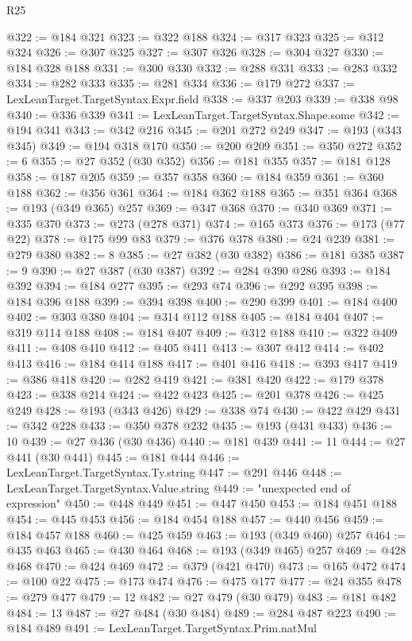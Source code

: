 \begin{lexlean}{R25}
\begin{coremodule}
@322 := @184 @321
@323 := @322 @188
@324 := @317 @323
@325 := @312 @324
@326 := @307 @325
@327 := @307 @326
@328 := @304 @327
@330 := @184 @328 @188
@331 := @300 @330
@332 := @288 @331
@333 := @283 @332
@334 := @282 @333
@335 := @281 @334
@336 := @179 @272
@337 := LexLeanTarget.TargetSyntax.Expr.field
@338 := @337 @203
@339 := @338 @98
@340 := @336 @339
@341 := LexLeanTarget.TargetSyntax.Shape.some
@342 := @194 @341
@343 := @342 @216
@345 := @201 @272 @249
@347 := @193 (@343 @345)
@349 := @194 @318 @170
@350 := @200 @209
@351 := @350 @272
@352 := 6
@355 := @27 @352 (@30 @352)
@356 := @181 @355
@357 := @181 @128
@358 := @187 @205
@359 := @357 @358
@360 := @184 @359
@361 := @360 @188
@362 := @356 @361
@364 := @184 @362 @188
@365 := @351 @364
@368 := @193 (@349 @365) @257
@369 := @347 @368
@370 := @340 @369
@371 := @335 @370
@373 := @273 (@278 @371)
@374 := @165 @373
@376 := @173 (@77 @22)
@378 := @175 @99 @83
@379 := @376 @378
@380 := @24 @239
@381 := @279 @380
@382 := 8
@385 := @27 @382 (@30 @382)
@386 := @181 @385
@387 := 9
@390 := @27 @387 (@30 @387)
@392 := @284 @390 @286
@393 := @184 @392
@394 := @184 @277
@395 := @293 @74
@396 := @292 @395
@398 := @184 @396 @188
@399 := @394 @398
@400 := @290 @399
@401 := @184 @400
@402 := @303 @380
@404 := @314 @112 @188
@405 := @184 @404
@407 := @319 @114 @188
@408 := @184 @407
@409 := @312 @188
@410 := @322 @409
@411 := @408 @410
@412 := @405 @411
@413 := @307 @412
@414 := @402 @413
@416 := @184 @414 @188
@417 := @401 @416
@418 := @393 @417
@419 := @386 @418
@420 := @282 @419
@421 := @381 @420
@422 := @179 @378
@423 := @338 @214
@424 := @422 @423
@425 := @201 @378
@426 := @425 @249
@428 := @193 (@343 @426)
@429 := @338 @74
@430 := @422 @429
@431 := @342 @228
@433 := @350 @378 @232
@435 := @193 (@431 @433)
@436 := 10
@439 := @27 @436 (@30 @436)
@440 := @181 @439
@441 := 11
@444 := @27 @441 (@30 @441)
@445 := @181 @444
@446 := LexLeanTarget.TargetSyntax.Ty.string
@447 := @291 @446
@448 := LexLeanTarget.TargetSyntax.Value.string
@449 := "unexpected end of expression"
@450 := @448 @449
@451 := @447 @450
@453 := @184 @451 @188
@454 := @445 @453
@456 := @184 @454 @188
@457 := @440 @456
@459 := @184 @457 @188
@460 := @425 @459
@463 := @193 (@349 @460) @257
@464 := @435 @463
@465 := @430 @464
@468 := @193 (@349 @465) @257
@469 := @428 @468
@470 := @424 @469
@472 := @379 (@421 @470)
@473 := @165 @472
@474 := @100 @22
@475 := @173 @474
@476 := @475 @177
@477 := @24 @355
@478 := @279 @477
@479 := 12
@482 := @27 @479 (@30 @479)
@483 := @181 @482
@484 := 13
@487 := @27 @484 (@30 @484)
@489 := @284 @487 @223
@490 := @184 @489
@491 := LexLeanTarget.TargetSyntax.Prim.natMul

\end{coremodule}
\end{lexlean}
